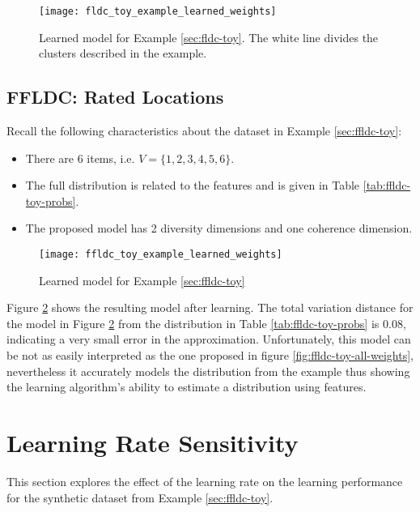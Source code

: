 \begin{figure}
  \centering
  \texttt{[image: fldc\_toy\_example\_learned\_weights]}
  \caption{Learned model for Example \ref{sec:fldc-toy}. The white line divides the clusters described in the example.}
  \label{fig:fldc-toy-learned-weights}
\end{figure}

\subsection{FFLDC: Rated Locations}

Recall the following characteristics about the dataset in Example \ref{sec:ffldc-toy}:

\begin{itemize}
  \item There are 6 items, i.e. $V = \{1,2,3,4,5,6\}$.
  \item The full distribution is related to the features and is given in Table \ref{tab:ffldc-toy-probs}.
  \item The proposed model has 2 diversity dimensions and one coherence dimension.
\end{itemize}

\begin{figure}
  \centering
  \texttt{[image: ffldc\_toy\_example\_learned\_weights]}
  \caption{Learned model for Example \ref{sec:ffldc-toy}}
  \label{fig:ffldc-toy-learned-weights}
\end{figure}

Figure \ref{fig:ffldc-toy-learned-weights} shows the resulting model after learning. The total variation distance for the model in Figure \ref{fig:ffldc-toy-learned-weights} from the distribution in Table \ref{tab:ffldc-toy-probs} is $0.08$, indicating a very small error in the approximation. Unfortunately, this model can be not as easily interpreted as the one proposed in figure \ref{fig:ffldc-toy-all-weights}, nevertheless it accurately models the distribution from the example thus showing the learning algorithm's ability to estimate a distribution using features. 

\section{Learning Rate Sensitivity}

This section explores the effect of the learning rate on the learning performance for the synthetic dataset from Example \ref{sec:ffldc-toy}.

